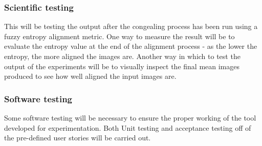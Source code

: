 \subsubsection{Scientific testing}

This will be testing the output after the congealing process has been run using a fuzzy entropy alignment metric. One way to measure the result will be to evaluate the entropy value at the end of the alignment process - as the lower the entropy, the more aligned the images are. Another way in which to test the output of the experiments will be to visually inspect the final mean images produced to see how well aligned the input images are.

\subsubsection{Software testing}

Some software testing will be necessary to ensure the proper working of the tool developed for experimentation. Both Unit testing and acceptance testing off of the pre-defined user stories will be carried out.
